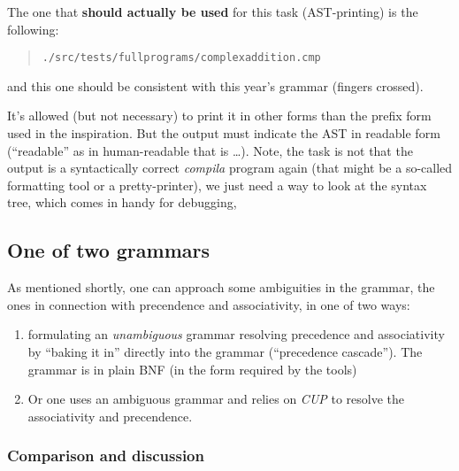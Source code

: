 \documentclass[10pt,freeform]{handout}[2014/08/13]
\begin{document}
The one that \textbf{should actually be used} for this task (AST-printing)
is the following:

\begin{quote}
  \texttt{./src/tests/fullprograms/complexaddition.cmp}  
\end{quote}

and this one should be consistent with this year's grammar (fingers
crossed).



It's allowed (but not necessary) to print it in other forms than the prefix
form used in the inspiration. But the output must indicate the AST in
readable form (``readable'' as in human-readable that is \ldots). Note, the
task is not that the output is a syntactically correct \textsl{compila}
program again (that might be a so-called formatting tool or a
pretty-printer), we just need a way to look at the syntax tree, which comes
in handy for debugging,


%
% 

\subsection{One of two grammars}
\label{sec:two-grammars}


As mentioned shortly, one can approach some ambiguities in the grammar, the
ones in connection with precendence and associativity, in one of two ways:

\begin{enumerate}
\item formulating an \emph{unambiguous} grammar resolving precedence and
  associativity by ``baking it in'' directly into the grammar (``precedence
  cascade''). The grammar is in plain BNF (in the form required by the
  tools)
\item Or one uses an ambiguous grammar and relies on \emph{CUP} to resolve
  the associativity and precendence.
\end{enumerate}

\subsubsection*{Comparison and discussion}
\label{sec:comparison}
\end{document}
